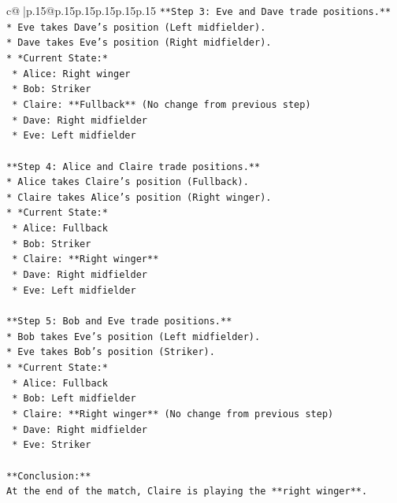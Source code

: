 \documentclass{article}
\begin{document}
{\begin{supertabular}{c@{$\;$}|p{.15\linewidth}@{}p{.15\linewidth}p{.15\linewidth}p{.15\linewidth}p{.15\linewidth}p{.15\linewidth}}
{{{\texttt{**Step 3: Eve and Dave trade positions.**} \\
\texttt{*   Eve takes Dave's position (Left midfielder).} \\
\texttt{*   Dave takes Eve's position (Right midfielder).} \\
\texttt{*   *Current State:*} \\
\texttt{    *   Alice: Right winger} \\
\texttt{    *   Bob: Striker} \\
\texttt{    *   Claire: **Fullback** (No change from previous step)} \\
\texttt{    *   Dave: Right midfielder} \\
\texttt{    *   Eve: Left midfielder} \\
\\ 
\texttt{**Step 4: Alice and Claire trade positions.**} \\
\texttt{*   Alice takes Claire's position (Fullback).} \\
\texttt{*   Claire takes Alice's position (Right winger).} \\
\texttt{*   *Current State:*} \\
\texttt{    *   Alice: Fullback} \\
\texttt{    *   Bob: Striker} \\
\texttt{    *   Claire: **Right winger**} \\
\texttt{    *   Dave: Right midfielder} \\
\texttt{    *   Eve: Left midfielder} \\
\\ 
\texttt{**Step 5: Bob and Eve trade positions.**} \\
\texttt{*   Bob takes Eve's position (Left midfielder).} \\
\texttt{*   Eve takes Bob's position (Striker).} \\
\texttt{*   *Current State:*} \\
\texttt{    *   Alice: Fullback} \\
\texttt{    *   Bob: Left midfielder} \\
\texttt{    *   Claire: **Right winger** (No change from previous step)} \\
\texttt{    *   Dave: Right midfielder} \\
\texttt{    *   Eve: Striker} \\
\\ 
\texttt{**Conclusion:**} \\
\texttt{At the end of the match, Claire is playing the **right winger**.} \\
}}}
\end{supertabular}}
\end{document}

